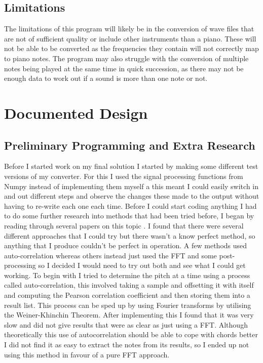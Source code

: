 \documentclass[12pt]{report}
\begin{document}
\subsection*{Limitations}
The limitations of this program will likely be in the conversion of wave files that are not of sufficient quality or include other instruments than a piano. These will not be able to be converted as the frequencies they contain will not correctly map to piano notes. The program may also struggle with the conversion of multiple notes being played at the same time in quick succession, as there may not be enough data to work out if a sound is more than one note or not.

\section*{Documented Design}

\subsection*{Preliminary Programming and Extra Research}
Before I started work on my final solution I started by making some different test versions of my converter. For this I used the signal processing functions from Numpy instead of implementing them myself a this meant I could easily switch in and out different steps and observe the changes these made to the output without having to re-write each one each time. 
Before I could start coding anything I had to do some further research into methods that had been tried before, I began by reading through several papers on this topic \cite{spectrum} \cite{autocorrelation_transcription} \cite{pitch_detection} \cite{pitch_perception}. I found that there were several different approaches that I could try but there wasn't a know perfect method, so anything that I produce couldn't be perfect in operation. A few methods used auto-correlation whereas others instead just used the FFT and some post-processing so I decided I would need to try out both and see what I could get working.
To begin with I tried to determine the pitch at a time using a process called auto-correlation, this involved taking a sample and offsetting it with itself and computing the Pearson correlation coefficient and then storing them into a result list. This process can be sped up by using Fourier transforms by utilising the Weiner-Khinchin Theorem\cite{w_k}.
After implementing this I found that it was very slow and did not give results that were as clear as just using a FFT. Although theoretically this use of autocorrelation should be able to cope with chords better I did not find it as easy to extract the notes from its results, so I ended up not using this method in favour of a pure FFT approach.
\end{document}
